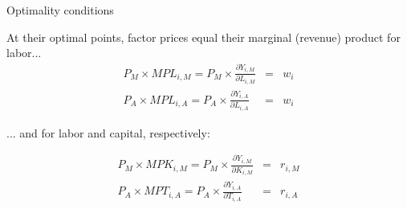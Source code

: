 \documentclass[notes,11pt, aspectratio=169, xcolor=table]{beamer}
\newenvironment{wideitemize}{\itemize\addtolength{\itemsep}{10pt}}{\enditemize}
\begin{document}
\begin{frame}{Optimality conditions}
\begin{wideitemize}
    
        \item At their optimal points, factor prices equal their marginal (revenue) product for labor...
        \begin{eqnarray*}
            P_M \times MPL_{i,M} = P_M \times  \frac{\partial Y_{i,M}}{\partial L_{i,M}} &=& w_i\\
            P_A \times MPL_{i,A} = P_A \times  \frac{\partial Y_{i,A}}{\partial L_{i,A}} &=& w_i 
        \end{eqnarray*}

        \item<2-> ... and for labor and capital, respectively:

                \begin{eqnarray*}
            P_M \times MPK_{i,M} =  P_M \times  \frac{\partial Y_{i,M}}{\partial K_{i,M}} &=&r_{i,M} \\
            P_A \times MPT_{i,A} = P_A \times  \frac{\partial Y_{i,A}}{\partial T_{i,A}} &=& r_{i,A}
        \end{eqnarray*}

\end{wideitemize}    
\end{frame}
\end{document}
